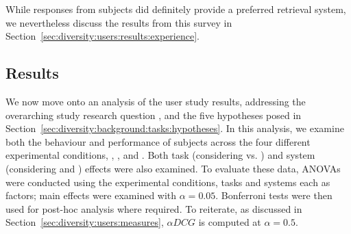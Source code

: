 \vspace*{-4mm}
While responses from subjects did definitely provide a preferred retrieval system, we nevertheless discuss the results from this survey in Section~\ref{sec:diversity:users:results:experience}.

\vspace*{-4mm}
\subsection{Results}
\vspace*{-4mm}
We now move onto an analysis of the user study results, addressing the overarching study research question , and the five hypotheses posed in Section~\ref{sec:diversity:background:tasks:hypotheses}. In this analysis, we examine both the behaviour and performance of subjects across the four different experimental conditions, , ,  and . Both task (considering  vs. ) and system (considering  and ) effects were also examined. To evaluate these data, ANOVAs were conducted using the experimental conditions, tasks and systems each as factors; main effects were examined with $\alpha=0.05$. Bonferroni tests were then used for post-hoc analysis where required. To reiterate, as discussed in Section~\ref{sec:diversity:users:measures}, $\alpha DCG$ is computed at $\alpha=0.5$.


